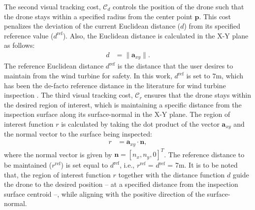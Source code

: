 \documentclass[letterpaper, 10 pt, conference]{ieeeconf}  %
\newtheorem{remark}{Remark}[section]
\newcommand{\hanote}[1]{{\xxnote{HA}{red}{#1}}} %
\newcommand{\xxnote}[3]{}
\renewcommand{\xxnote}[3]{\color{#2}{#1: #3}}
\begin{document}
The second visual tracking cost, $\mathcal{C}_{d}$ controls the position of the drone such that the drone stays within a specified radius from the center point $\mathbf{p}$. This cost penalizes the deviation of the current Euclidean distance ($d$) from its specified reference value ($d^\textrm{ref}$). Also, the Euclidean distance is calculated in the X-Y plane as follows:
\begin{align}\label{eq:euc_dist}
    d &= \| \mathbf{a}_{xy}\|.
\end{align}
The reference Euclidean distance $d^\textrm{ref}$ is the distance that the user desires to maintain from the wind turbine for safety. In this work, $d^{\textrm{ref}}$ is set to $7$m, which has been the de-facto reference distance in the literature for wind turbine inspection \cite{lidar2,stokkeland,ICUAS2020}. 
The third visual tracking cost, $\mathcal{C}_{r}$ ensures that the drone stays within the desired region of interest, which is maintaining a specific distance from the inspection surface along its surface-normal in the X-Y plane. The region of interest function $r$ is calculated by taking the dot product of the vector $\mathbf{a}_{xy}$ and the normal vector to the surface being inspected:
%
\begin{align}\label{eq:roi_functon}
    r &= \mathbf{a}_{xy}\cdot \mathbf{n},
\end{align}
%
where the normal vector is given by $\mathbf{n} = [n_x, n_y, 0]^T$. The reference distance to be maintained ($r^\textrm{ref}$) is set equal to $d^{\textrm{ref}}$, i.e., $r^{\textrm{ref}}$ = $d{^\textrm{ref}}$ = 7m. It is to be noted that, the region of interest function $r$ together with the distance function $d$ guide the drone to the desired position -- at a specified distance from the inspection surface centroid --, while aligning with the positive direction of the surface-normal. \\
\end{document}
